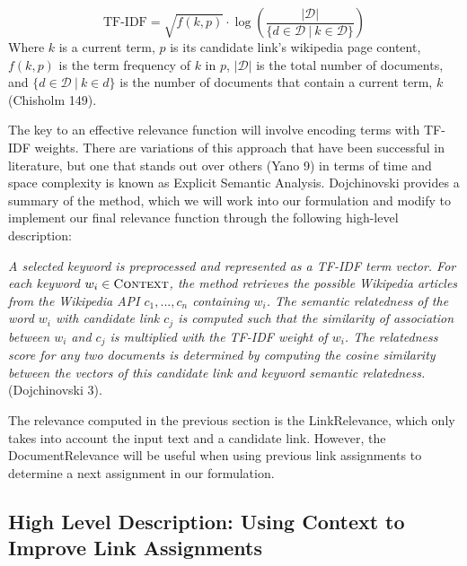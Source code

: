 \documentclass[twoside,11pt]{article}
\begin{document}
$$\mbox{TF-IDF} = \sqrt{f(k, p)} \cdot \log \left( \frac{|\mathcal{D}|}{\{d \in \mathcal{D} \ | \ k \in \mathcal{D}\}} \right) $$
Where $k$ is a current term, $p$ is its candidate link's wikipedia page content, $f(k,p)$ is the term frequency of $k$ in $p$, $|\mathcal{D}|$ is the total number of documents, and $\{d \in \mathcal{D} \ | \ k \in d\}$ is the number of documents that contain a current term, $k$ (Chisholm 149).

The key to an effective relevance function will involve encoding terms with TF-IDF weights. There are variations of this approach that have been successful in literature, but one that stands out over others (Yano 9) in terms of time and space complexity is known as Explicit Semantic Analysis. Dojchinovski provides a summary of the method, which we will work into our formulation and modify to implement our final relevance function through the following high-level description:

\textit{A selected keyword is preprocessed and represented as a TF-IDF term vector. For each keyword $w_i \in \mbox{\sc Context}$, the method retrieves the possible Wikipedia articles from the Wikipedia API $c_1,... ,c_n$ containing $w_i$. The semantic relatedness of the word $w_i$ with candidate link $c_j$ is computed such that the similarity of association between $w_i$ and $c_j$ is multiplied with the TF-IDF weight of $w_i$. The relatedness score for any two documents is determined by computing the cosine similarity between the vectors of this candidate link and keyword semantic relatedness.} (Dojchinovski 3).

The relevance computed in the previous section is the {\sc LinkRelevance}, which only takes into account the input text and a candidate link. However, the {\sc DocumentRelevance} will be useful when using previous link assignments to determine a next assignment in our formulation.


\subsection{High Level Description: Using Context to Improve Link Assignments}
\end{document}
